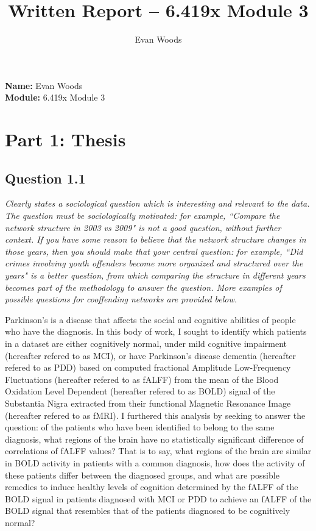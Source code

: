 \documentclass[12pt]{article}
\title{Written Report – 6.419x Module 3}
\author{Evan Woods}
\date{}
\begin{document}
\maketitle

\tableofcontents
\newpage


\noindent \textbf{Name:} Evan Woods \\
\noindent \textbf{Module:} 6.419x Module 3

\section{Part 1: Thesis}

\subsection{Question 1.1}
\textit{Clearly states a sociological question which is interesting and relevant to the data. The question must be sociologically motivated: for example, “Compare the network structure in 2003 vs 2009" is not a good question, without further context. If you have some reason to believe that the network structure changes in those years, then you should make that your central question: for example, “Did crimes involving youth offenders become more organized and structured over the years" is a better question, from which comparing the structure in different years becomes part of the methodology to answer the question. More examples of possible questions for cooffending networks are provided below. }

Parkinson's is a disease that affects the social and cognitive abilities of people who have the diagnosis. In this body of work, I sought to identify which patients in a dataset are either cognitively normal, under mild cognitive impairment (hereafter refered to as MCI), or have Parkinson's disease dementia (hereafter refered to as PDD) based on computed fractional Amplitude Low-Frequency Fluctuations (hereafter refered to as fALFF) from the mean of the Blood Oxidation Level Dependent (hereafter refered to as BOLD) signal of the Substantia Nigra extracted from their functional Magnetic Resonance Image (hereafter refered to as fMRI). I furthered this analysis by seeking to answer the question: of the patients who have been identified to belong to the same diagnosis, what regions of the brain have no statistically significant difference of correlations of fALFF values? That is to say, what regions of the brain are similar in BOLD activity in patients with a common diagnosis, how does the activity of these patients differ between the diagnosed groups, and what are possible remedies to induce healthy levels of cognition determined by the fALFF of the BOLD signal in patients diagnosed with MCI or PDD to achieve an fALFF of the BOLD signal that resembles that of the patients diagnosed to be cognitively normal?   
\end{document}

